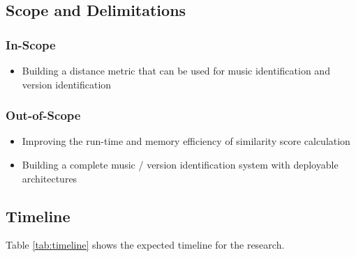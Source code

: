 \documentclass[../main.tex]{subfiles}
\begin{document}
\subsection{Scope and Delimitations}

\subsubsection{In-Scope}
\begin{itemize}
    \item Building a distance metric that can be used for music identification and version identification
\end{itemize}

\subsubsection{Out-of-Scope}
\begin{itemize}
    \item Improving the run-time and memory efficiency of similarity score calculation
    \item Building a complete music / version identification system with deployable architectures
\end{itemize}


\newpage
\subsection{Timeline}

Table \ref{tab:timeline} shows the expected timeline for the research.

\begin{table}[H]
    \centering
    \caption{Expected Timeline}
    \label{tab:timeline}
\end{table}
\end{document}
